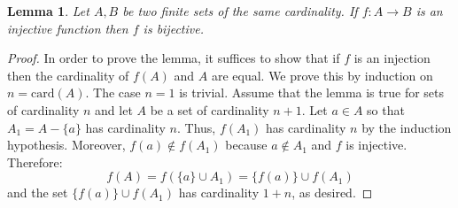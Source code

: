 \documentclass[12pt]{article}
\newtheorem*{lemma}{Lemma}
\theoremstyle{definition}
\begin{document}
\begin{lemma}
Let $A,B$ be two finite sets of the same cardinality. If $f\colon A \to B$ is an injective function then $f$ is bijective.
\end{lemma}
\begin{proof}
In order to prove the lemma, it suffices to show that if $f$ is an injection then the cardinality of $f(A)$ and $A$ are equal. We prove this by induction on $n=\text{card}(A)$. The case $n=1$ is trivial. Assume that the lemma is true for sets of cardinality $n$ and let $A$ be a set of cardinality $n+1$. Let $a\in A$ so that $A_1=A-\{a\}$ has cardinality $n$. Thus, $f(A_1)$ has cardinality $n$ by the induction hypothesis. Moreover, $f(a)\notin f(A_1)$ because $a\notin A_1$ and $f$ is injective. Therefore:
$$f(A)=f(\{a\}\cup A_1)=\{f(a)\}\cup f(A_1)$$
and the set $\{f(a)\}\cup f(A_1)$ has cardinality $1+n$, as desired.
\end{proof}
\end{document}
